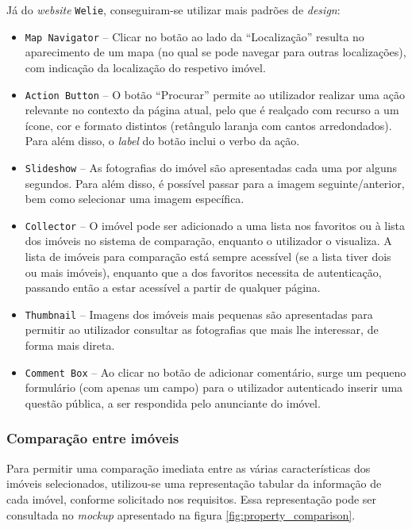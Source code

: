 Já do \textit{website} \texttt{Welie}, conseguiram-se utilizar mais padrões de \textit{design}:

\begin{itemize}
    \item \texttt{Map Navigator} -- Clicar no botão ao lado da ``Localização'' resulta no aparecimento de um mapa (no qual se pode navegar para outras localizações), com indicação da localização do respetivo imóvel.
    
    \item \texttt{Action Button} -- O botão ``Procurar'' permite ao utilizador realizar uma ação relevante no contexto da página atual, pelo que é realçado com recurso a um ícone, cor e formato distintos (retângulo laranja com cantos arredondados). Para além disso, o \textit{label} do botão inclui o verbo da ação.
    
    \item \texttt{Slideshow} -- As fotografias do imóvel são apresentadas cada uma por alguns segundos. Para além disso, é possível passar para a imagem seguinte/anterior, bem como selecionar uma imagem específica.
    
    \item \texttt{Collector} -- O imóvel pode ser adicionado a uma lista nos favoritos ou à lista dos imóveis no sistema de comparação, enquanto o utilizador o visualiza. A lista de imóveis para comparação está sempre acessível (se a lista tiver dois ou mais imóveis), enquanto que a dos favoritos necessita de autenticação, passando então a estar acessível a partir de qualquer página.
    
    \item \texttt{Thumbnail} -- Imagens dos imóveis mais pequenas são apresentadas para permitir ao utilizador consultar as fotografias que mais lhe interessar, de forma mais direta.
    
    \item \texttt{Comment Box} -- Ao clicar no botão de adicionar comentário, surge um pequeno formulário (com apenas um campo) para o utilizador autenticado inserir uma questão pública, a ser respondida pelo anunciante do imóvel.
\end{itemize}


\subsubsection{Comparação entre imóveis}

Para permitir uma comparação imediata entre as várias características dos imóveis selecionados, utilizou-se uma representação tabular da informação de cada imóvel, conforme solicitado nos requisitos. Essa representação pode ser consultada no \textit{mockup} apresentado na figura \ref{fig:property_comparison}.

